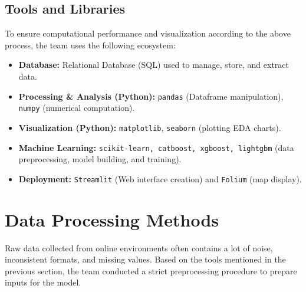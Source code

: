 \documentclass[12pt, a4paper]{article}
\begin{document}
\subsection{Tools and Libraries}
To ensure computational performance and visualization according to the above process, the team uses the following ecosystem:
\begin{itemize}[noitemsep, topsep=0pt]
    \item \textbf{Database:} Relational Database (SQL) used to manage, store, and extract data.
    \item \textbf{Processing \& Analysis (Python):} \texttt{pandas} (Dataframe manipulation), \texttt{numpy} (numerical computation).
    \item \textbf{Visualization (Python):} \texttt{matplotlib}, \texttt{seaborn} (plotting EDA charts).
    \item \textbf{Machine Learning:} \texttt{scikit-learn, catboost, xgboost, lightgbm} (data preprocessing, model building, and training).
    \item \textbf{Deployment:} \texttt{Streamlit} (Web interface creation) and \texttt{Folium} (map display).
\end{itemize}

\section{Data Processing Methods}
Raw data collected from online environments often contains a lot of noise, inconsistent formats, and missing values. Based on the tools mentioned in the previous section, the team conducted a strict preprocessing procedure to prepare inputs for the model.
\end{document}
